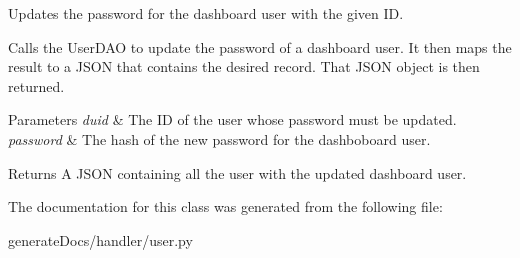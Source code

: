 Updates the password for the dashboard user with the given ID. 

Calls the User\+D\+AO to update the password of a dashboard user. It then maps the result to a J\+S\+ON that contains the desired record. That J\+S\+ON object is then returned.


\begin{DoxyParams}{Parameters}
{\em duid} & The ID of the user whose password must be updated. \\
\hline
{\em password} & The hash of the new password for the dashboboard user.\\
\hline
\end{DoxyParams}
\begin{DoxyReturn}{Returns}
A J\+S\+ON containing all the user with the updated dashboard user. 
\end{DoxyReturn}


The documentation for this class was generated from the following file\+:\begin{DoxyCompactItemize}
\item 
generate\+Docs/handler/user.\+py\end{DoxyCompactItemize}
